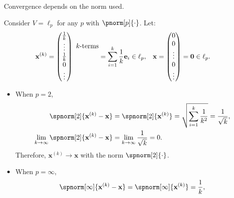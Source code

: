 \documentclass{huhtakm-template-book-v2}
\begin{document}
    \begin{rem}
        Convergence depends on the norm used.
    \end{rem}
    \begin{eg}
        Consider $V = \ell_{p}$ for any $p$ with $\pnorm[p]{\cdot}$. Let:
        \begin{align*}
            \mathbf{x}^{(k)} &= \begin{pmatrix}
                \frac{1}{k}\\
                \vdots\\
                \frac{1}{k}\\
                0\\
                \vdots
            \end{pmatrix}~\begin{array}{@{} c @{}}
                \\
                k\text{-terms}\\[1.5ex]
                \\
                \\
                \mathstrut
            \end{array} = \sum_{i=1}^{k}\frac{1}{k}\mathbf{e}_{i} \in \ell_{p}, & \mathbf{x} &= \begin{pmatrix}
                0\\
                0\\
                \vdots\\
                0\\
                \vdots
            \end{pmatrix} = \mathbf{0} \in \ell_{p}.
        \end{align*}
        \begin{itemize}
            \item[] When $p = 2$,
            \begin{align*}
                \spnorm[2]{\mathbf{x}^{(k)} - \mathbf{x}} &= \spnorm[2]{\mathbf{x}^{(k)}} = \sqrt{\sum_{i=1}^{k}\frac{1}{k^{2}}} = \frac{1}{\sqrt{k}},\\
                \lim_{k \to \infty}\spnorm[2]{\mathbf{x}^{(k)} - \mathbf{x}} &= \lim_{k \to \infty}\frac{1}{\sqrt{k}} = 0.
            \end{align*}
            Therefore, $\mathbf{x}^{(k)} \to \mathbf{x}$ with the norm $\spnorm[2]{\cdot}$.
            \item[] When $p = \infty$,
            \begin{align*}
                \spnorm[\infty]{\mathbf{x}^{(k)} - \mathbf{x}} &= \spnorm[\infty]{\mathbf{x}^{(k)}} = \frac{1}{k},\\

\end{align*}
\end{itemize}
\end{eg}
\end{document}
